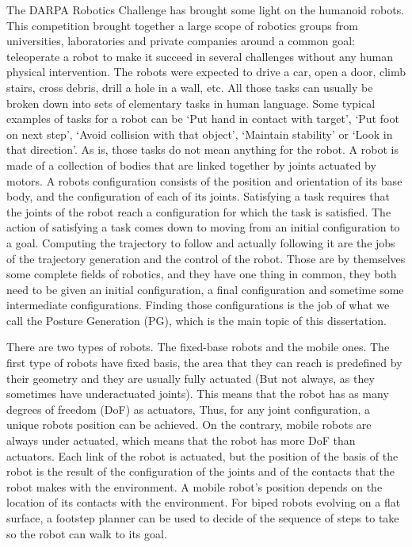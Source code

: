 The DARPA Robotics Challenge has brought some light on the humanoid robots.
This competition brought together a large scope of robotics groups from universities, laboratories and private companies around a common goal: teleoperate a robot to make it succeed in several challenges without any human physical intervention.
The robots were expected to drive a car, open a door, climb stairs, cross debris, drill a hole in a wall, etc.
All those tasks can usually be broken down into sets of elementary tasks in human language.
Some typical examples of tasks for a robot can be `Put hand in contact with target', `Put foot on next step', `Avoid collision with that object', `Maintain stability' or `Look in that direction'.
As is, those tasks do not mean anything for the robot.
A robot is made of a collection of bodies that are linked together by joints actuated by motors.
A robots configuration consists of the position and orientation of its base body, and the configuration of each of its joints.
Satisfying a task requires that the joints of the robot reach a configuration for which the task is satisfied.
The action of satisfying a task comes down to moving from an initial configuration to a goal.
Computing the trajectory to follow and actually following it are the jobs of the trajectory generation and the control of the robot.
Those are by themselves some complete fields of robotics, and they have one thing in common, they both need to be given an initial configuration, a final configuration and sometime some intermediate configurations.
Finding those configurations is the job of what we call the Posture Generation (PG), which is the main topic of this dissertation.

There are two types of robots. The fixed-base robots and the mobile ones.
The first type of robots have fixed basis, the area that they can reach is predefined by their geometry and they are usually fully actuated (But not always, as they sometimes have underactuated joints).
This means that the robot has as many degrees of freedom (DoF) as actuators, Thus, for any joint configuration, a unique robots position can be achieved.
On the contrary, mobile robots are always under actuated, which means that the robot has more DoF than actuators.
Each link of the robot is actuated, but the position of the basis of the robot is the result of the configuration of the joints and of the contacts that the robot makes with the environment.
A mobile robot's position depends on the location of its contacts with the environment.
For biped robots evolving on a flat surface, a footstep planner can be used to decide of the sequence of steps to take so the robot can walk to its goal.

